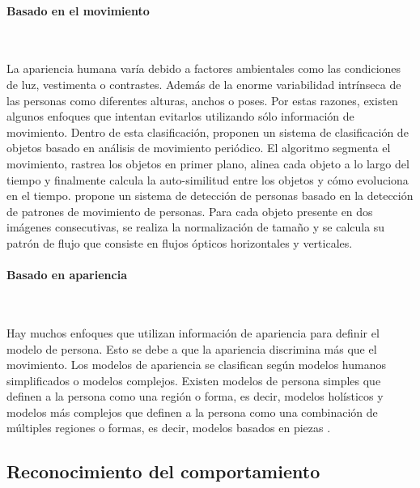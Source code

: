 \paragraph*{Basado en el movimiento}\mbox{} \\
\label{parag:basado-movimiento-people-model}

La apariencia humana varía debido a factores ambientales como las condiciones de luz, vestimenta o contrastes. Además de la enorme variabilidad intrínseca de las personas como diferentes alturas, anchos o poses. Por estas razones, existen algunos enfoques que intentan evitarlos utilizando sólo información de movimiento. Dentro de esta clasificación, \cite{868681} proponen un sistema de clasificación de objetos basado en análisis de movimiento periódico. El algoritmo segmenta el movimiento, rastrea los objetos en primer plano, alinea cada objeto a lo largo del tiempo y finalmente calcula la auto-similitud entre los objetos y cómo evoluciona en el tiempo. \cite{1334092} propone un sistema de detección de personas basado en la detección de patrones de movimiento de personas. Para cada objeto presente en dos imágenes consecutivas, se realiza la normalización de tamaño y se calcula su patrón de flujo que consiste en flujos ópticos horizontales y verticales.

\paragraph*{Basado en apariencia}\mbox{} \\
\label{parag:basado-apariencia-people-model}

Hay muchos enfoques que utilizan información de apariencia para definir el modelo de persona. Esto se debe a que la apariencia discrimina más que el movimiento. Los modelos de apariencia se clasifican según modelos humanos simplificados o modelos complejos. Existen modelos de persona simples que definen a la persona como una región o forma, es decir, modelos holísticos \cite{1334092} y modelos más complejos que definen a la persona como una combinación de múltiples regiones o formas, es decir, modelos basados en piezas \cite{5255236}.

\subsection{Reconocimiento del comportamiento}
\label{subsec:tecnicas-reconocimiento-comportamiento}

